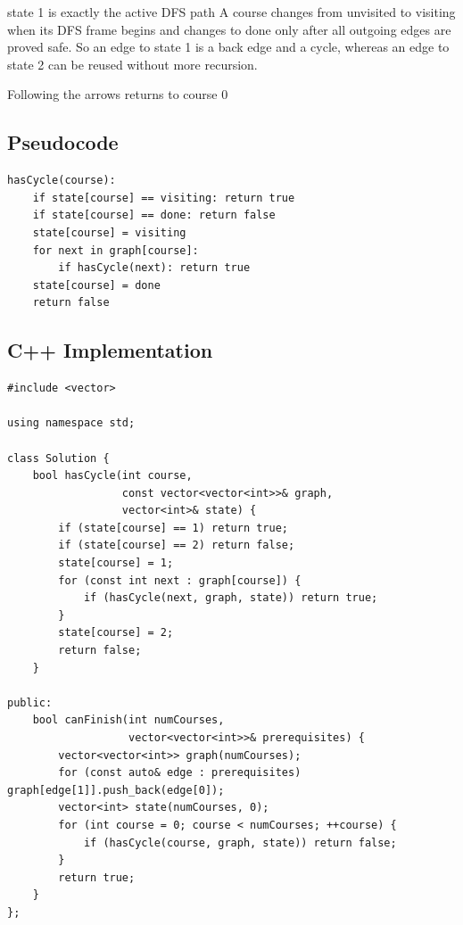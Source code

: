 \begin{invariantbox}{state 1 is exactly the active DFS path}
A course changes from unvisited to visiting when its DFS frame begins and
changes to done only after all outgoing edges are proved safe. So an
edge to state 1 is a back edge and a cycle, whereas an edge to state 2 can be
reused without more recursion.
\end{invariantbox}

\begin{visualbox}{Following the arrows returns to course 0}
\centering
{}
\end{visualbox}

\subsection{Pseudocode}
\begin{lstlisting}[style=pseudocode]
hasCycle(course):
    if state[course] == visiting: return true
    if state[course] == done: return false
    state[course] = visiting
    for next in graph[course]:
        if hasCycle(next): return true
    state[course] = done
    return false
\end{lstlisting}

\subsection{C++ Implementation}
\begin{lstlisting}[style=compactcode,caption={Complete C++ solution: Course Schedule}]
#include <vector>

using namespace std;

class Solution {
    bool hasCycle(int course,
                  const vector<vector<int>>& graph,
                  vector<int>& state) {
        if (state[course] == 1) return true;
        if (state[course] == 2) return false;
        state[course] = 1;
        for (const int next : graph[course]) {
            if (hasCycle(next, graph, state)) return true;
        }
        state[course] = 2;
        return false;
    }

public:
    bool canFinish(int numCourses,
                   vector<vector<int>>& prerequisites) {
        vector<vector<int>> graph(numCourses);
        for (const auto& edge : prerequisites) graph[edge[1]].push_back(edge[0]);
        vector<int> state(numCourses, 0);
        for (int course = 0; course < numCourses; ++course) {
            if (hasCycle(course, graph, state)) return false;
        }
        return true;
    }
};
\end{lstlisting}

